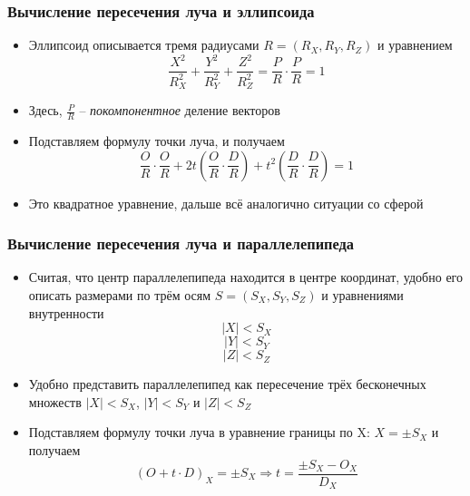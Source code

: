 \documentclass[10pt,handout]{beamer}
\begin{document}
\begin{frame}
\frametitle{Вычисление пересечения луча и эллипсоида}
\begin{itemize}
\item Эллипсоид описывается тремя радиусами \begin{math}R=(R_X, R_Y, R_Z)\end{math} и уравнением
\begin{equation}
\frac{X^2}{R_X^2} + \frac{Y^2}{R_Y^2} + \frac{Z^2}{R_Z^2} = \frac{P}{R}\cdot \frac{P}{R} = 1
\end{equation}
\pause
\item Здесь, \begin{math}\frac{P}{R}\end{math} -- \textit{покомпонентное} деление векторов
\pause
\item Подставляем формулу точки луча, и получаем
\begin{equation}
\frac{O}{R}\cdot \frac{O}{R} + 2t \left(\frac{O}{R}\cdot \frac{D}{R}\right) + t^2 \left(\frac{D}{R}\cdot \frac{D}{R}\right) = 1
\end{equation}
\pause
\item Это квадратное уравнение, дальше всё аналогично ситуации со сферой
\end{itemize}
\end{frame}

\begin{frame}
\frametitle{Вычисление пересечения луча и параллелепипеда}
\begin{itemize}
\item Считая, что центр параллелепипеда находится в центре координат, удобно его описать размерами по трём осям \begin{math}S=(S_X, S_Y, S_Z)\end{math} и уравнениями внутренности
\begin{equation}
|X| < S_X
\end{equation}
\begin{equation}
|Y| < S_Y
\end{equation}
\begin{equation}
|Z| < S_Z
\end{equation}
\pause
\item Удобно представить параллелепипед как пересечение трёх бесконечных множеств \begin{math}|X| < S_X\end{math}, \begin{math}|Y| < S_Y\end{math} и \begin{math}|Z| < S_Z\end{math}
\pause
\item Подставляем формулу точки луча в уравнение границы по X: \begin{math}X = \pm S_X\end{math} и получаем
\begin{equation}
(O+t\cdot D)_X = \pm S_X \Longrightarrow t = \frac{\pm S_X - O_X}{D_X}
\end{equation}
\end{itemize}
\end{frame}
\end{document}
